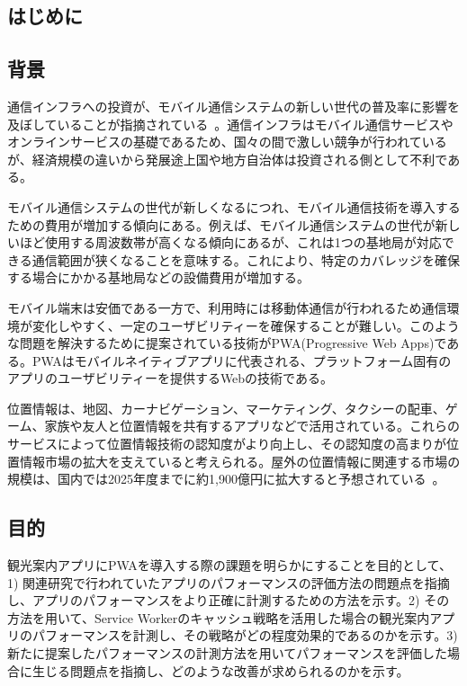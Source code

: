 \maketitle
\begin{multicols*}{2}

\section{はじめに}
\subsection{背景}
通信インフラへの投資が、モバイル通信システムの新しい世代の普及率に影響を及ぼしていることが指摘されている~\cite{Forge2020FormingA5GStrategyForDevelopingCountries}。通信インフラはモバイル通信サービスやオンラインサービスの基礎であるため、国々の間で激しい競争が行われているが、経済規模の違いから発展途上国や地方自治体は投資される側として不利である。

モバイル通信システムの世代が新しくなるにつれ、モバイル通信技術を導入するための費用が増加する傾向にある。例えば、モバイル通信システムの世代が新しいほど使用する周波数帯が高くなる傾向にあるが、これは1つの基地局が対応できる通信範囲が狭くなることを意味する。これにより、特定のカバレッジを確保する場合にかかる基地局などの設備費用が増加する。

モバイル端末は安価である一方で、利用時には移動体通信が行われるため通信環境が変化しやすく、一定のユーザビリティーを確保することが難しい。このような問題を解決するために提案されている技術がPWA(Progressive Web Apps)である。PWAはモバイルネイティブアプリに代表される、プラットフォーム固有のアプリのユーザビリティーを提供するWebの技術である。

位置情報は、地図、カーナビゲーション、マーケティング、タクシーの配車、ゲーム、家族や友人と位置情報を共有するアプリなどで活用されている。これらのサービスによって位置情報技術の認知度がより向上し、その認知度の高まりが位置情報市場の拡大を支えていると考えられる。屋外の位置情報に関連する市場の規模は、国内では2025年度までに約1,900億円に拡大すると予想されている~\cite{MIC2023InformationStatistics}。
\subsection{目的}
観光案内アプリにPWAを導入する際の課題を明らかにすることを目的として、1) 関連研究で行われていたアプリのパフォーマンスの評価方法の問題点を指摘し、アプリのパフォーマンスをより正確に計測するための方法を示す。2) その方法を用いて、Service Workerのキャッシュ戦略を活用した場合の観光案内アプリのパフォーマンスを計測し、その戦略がどの程度効果的であるのかを示す。3) 新たに提案したパフォーマンスの計測方法を用いてパフォーマンスを評価した場合に生じる問題点を指摘し、どのような改善が求められるのかを示す。

\end{multicols*}
